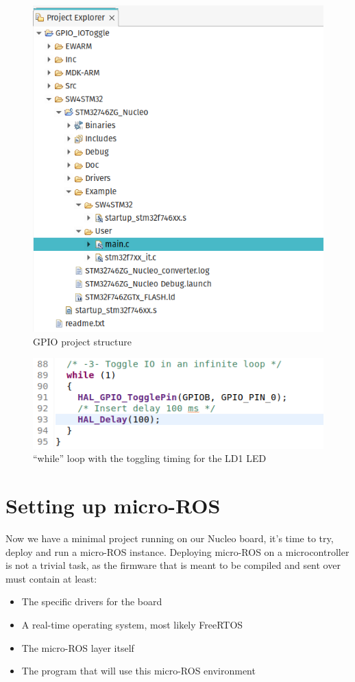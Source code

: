 \documentclass[10pt]{article}
\begin{document}
\begin{figure}[H]
  \centering
  \includegraphics[width=.9\textwidth]{./img/tree.png}
  \caption{GPIO project structure}
  \label{fig:tree}
\end{figure}

\begin{figure}[H]
  \centering
  \includegraphics[width=.9\textwidth]{./img/toggle_led.png}
  \caption{``while'' loop with the toggling timing for the LD1 LED}
  \label{fig:toggle_led}
\end{figure}

\pagebreak
\section{Setting up micro-ROS}
\label{sec:micro-ros}
Now we have a minimal project running on our Nucleo board, it's time to try, deploy and run a micro-ROS instance.
Deploying micro-ROS on a microcontroller is not a trivial task, as the firmware that is meant to be compiled and sent over must contain at least:
\begin{itemize}
\item The specific drivers for the board
\item A real-time operating system, most likely FreeRTOS
\item The micro-ROS layer itself
\item The program that will use this micro-ROS environment
\end{itemize}
\end{document}
